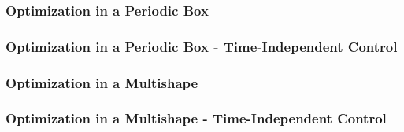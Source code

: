 \documentclass[11pt, a4paper]{article}
\theoremstyle{definition}
\begin{document}
\subsubsection{Optimization in a Periodic Box}
\subsubsection{Optimization in a Periodic Box - Time-Independent Control}

\subsubsection{Optimization in a Multishape}
\subsubsection{Optimization in a Multishape - Time-Independent Control}


\pagebreak	


\end{document}
